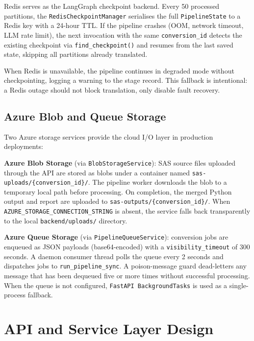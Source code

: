 Redis serves as the LangGraph checkpoint backend. Every 50 processed partitions,
the \texttt{RedisCheckpointManager} serialises the full \texttt{PipelineState}
to a Redis key with a 24-hour TTL. If the pipeline crashes (OOM, network timeout,
LLM rate limit), the next invocation with the same \texttt{conversion\_id}
detects the existing checkpoint via \texttt{find\_checkpoint()} and resumes from
the last saved state, skipping all partitions already translated.

When Redis is unavailable, the pipeline continues in degraded mode without
checkpointing, logging a warning to the stage record. This fallback is
intentional: a Redis outage should not block translation, only disable
fault recovery.

\subsection{Azure Blob and Queue Storage}
\label{subsec:azure-storage-schema}

Two Azure storage services provide the cloud I/O layer in production deployments:

\textbf{Azure Blob Storage} (via \texttt{BlobStorageService}): SAS source files
uploaded through the API are stored as blobs under a container named
\texttt{sas-uploads/\{conversion\_id\}/}. The pipeline worker downloads the
blob to a temporary local path before processing. On completion, the merged
Python output and report are uploaded to
\texttt{sas-outputs/\{conversion\_id\}/}. When \texttt{AZURE\_STORAGE\_CONNECTION\_STRING}
is absent, the service falls back transparently to the local
\texttt{backend/uploads/} directory.

\textbf{Azure Queue Storage} (via \texttt{PipelineQueueService}): conversion
jobs are enqueued as JSON payloads (base64-encoded) with a
\texttt{visibility\_timeout} of 300 seconds. A daemon consumer thread polls
the queue every 2 seconds and dispatches jobs to \texttt{run\_pipeline\_sync}.
A poison-message guard dead-letters any message that has been dequeued five or
more times without successful processing. When the queue is not configured,
\texttt{FastAPI BackgroundTasks} is used as a single-process fallback.

\section{API and Service Layer Design}
\label{sec:api-design}

